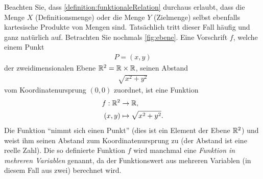 \noindent
Beachten Sie, dass \cref{definition:funktionaleRelation} durchaus erlaubt, dass die Menge $X$ (Definitionsmenge) oder die Menge $Y$ (Zielmenge) selbst ebenfalls kartesische Produkte von Mengen sind. Tatsächlich tritt dieser Fall häufig und ganz natürlich auf. Betrachten Sie nochmals \cref{fig:ebene}. Eine Vorschrift $f$, welche einem Punkt
\begin{align*}
    P = (x,y)
\end{align*}
der zweidimensionalen Ebene $\mathbb{R}^2 = \mathbb{R}\times\mathbb{R}$, seinen Abstand
\begin{align*}
    \sqrt{x^2 + y^2}
\end{align*}
vom Koordinatenursprung $(0,0)$ zuordnet, ist eine Funktion
\begin{align*}
    f: \mathbb{R}^2 &\to\mathbb{R},\\
    (x,y) &\mapsto \sqrt{x^2 + y^2}.
\end{align*}
Die Funktion \enquote{nimmt sich einen Punkt} (dies ist ein Element der Ebene $\mathbb{R}^2$) und weist ihm seinen Abstand zum Koordinatenursprung zu (der Abstand ist eine reelle Zahl). Die so definierte Funktion $f$ wird manchmal eine \textit{Funktion in mehreren Variablen} genannt, da der Funktionswert aus mehreren Variablen (in diesem Fall aus zwei) berechnet wird.

